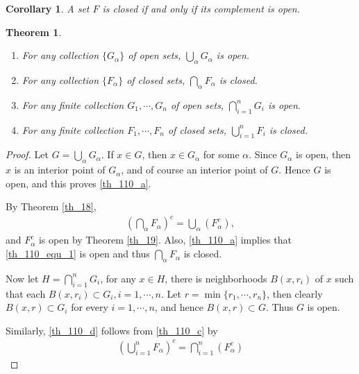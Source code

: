 \documentclass[11pt]{book}
\newtheorem{theorem}{Theorem}[chapter]
\newtheorem{corollary}{Corollary}[theorem]
\theoremstyle{definition}
\numberwithin{equation}{chapter}
\begin{document}
\medskip

\begin{corollary}
A set $F$ is closed if and only if its complement is open.
\end{corollary}

\medskip

\begin{theorem}\label{th_110}
~\begin{enumerate}[label=(\alph*)]
    \item For any collection $\{G_{\alpha}\}$ of open sets, $\bigcup_{\alpha} G_{\alpha}$ is open.\label{th_110_a}
    
    \item For any collection $\{F_{\alpha}\}$ of closed sets, $\bigcap_{\alpha} F_{\alpha}$ is closed.\label{th_110_b}
    
    \item For any finite collection $G_1, \cdots, G_n$ of open sets, $\bigcap^n_{i=1} G_i$ is open.\label{th_110_c}
    
    \item For any finite collection $F_1, \cdots, F_n$ of closed sets, $\bigcup^n_{i=1} F_i$ is closed.\label{th_110_d}
\end{enumerate}
\end{theorem}
\begin{proof}
Let $G = \bigcup_{\alpha} G_{\alpha}$. If $x \in G$, then $x \in G_{\alpha}$ for some $\alpha$. Since $G_{\alpha}$ is open, then $x$ is an interior point of $G_{\alpha}$, and of course an interior point of $G$. Hence $G$ is open, and this proves \ref{th_110_a}.

By Theorem \ref{th_18}, 
\begin{align}\label{th_110_equ_1}
    \left(\bigcap_{\alpha} F_{\alpha}\right)^c = \bigcup_{\alpha} \left(F_{\alpha}^c\right),
\end{align}
and $F_{\alpha}^c$ is open by Theorem \ref{th_19}. Also, \ref{th_110_a} implies that \eqref{th_110_equ_1} is open and thus $\bigcap_{\alpha} F_{\alpha}$ is closed.

Now let $H = \bigcap^n_{i=1} G_i$, for any $x \in H$, there is neighborhoods $B(x,r_i)$ of $x$ such that each $B(x,r_i) \subset G_i, i = 1, \cdots, n$. Let $r = \min \{r_1, \cdots, r_n\}$, then clearly $B(x,r) \subset G_i$ for every $i = 1, \cdots, n$, and hence $B(x,r) \subset G$. Thus $G$ is open.

Similarly, \ref{th_110_d} follows from \ref{th_110_c} by
\begin{align*}
    \left(\bigcup^n_{i=1} F_{\alpha}\right)^c = \bigcap^n_{i=1} \left(F_{\alpha}^c\right)
\end{align*}
\end{proof}
\end{document}
